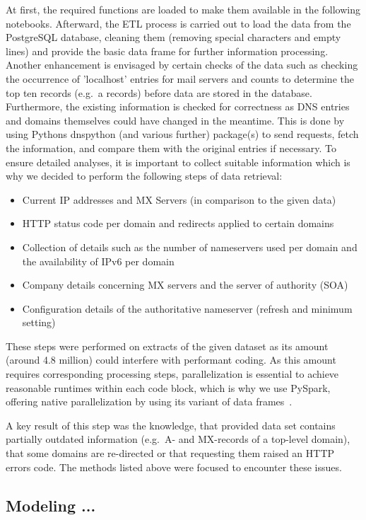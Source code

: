 At first, the required functions are loaded to make them available in the following notebooks.
Afterward, the ETL process is carried out to load the data from the PostgreSQL database, cleaning them (removing special characters and empty lines) and provide the basic data frame for further information processing.
Another enhancement is envisaged by certain checks of the data such as checking the occurrence of 'localhost' entries for mail servers and counts to determine the top ten records (e.g.\ a records) before data are stored in the database.
Furthermore, the existing information is checked for correctness as DNS entries and domains themselves could have changed in the meantime.
This is done by using Pythons dnspython (and various further) package(s) to send requests, fetch the information, and compare them with the original entries if necessary.
To ensure detailed analyses, it is important to collect suitable information which is why we decided to perform the following steps of data retrieval:
\begin{itemize}
    \item Current IP addresses and MX Servers (in comparison to the given data)
    \item HTTP status code per domain and redirects applied to certain domains
    \item Collection of details such as the number of nameservers used per domain and the availability of IPv6 per domain
    \item Company details concerning MX servers and the server of authority (SOA)
    \item Configuration details of the authoritative nameserver (refresh and minimum setting)
\end{itemize}
These steps were performed on extracts of the given dataset as its amount (around 4.8 million) could interfere with performant coding.
As this amount requires corresponding processing steps, parallelization is essential to achieve reasonable runtimes within each code block, which is why we use PySpark, offering native parallelization by using its variant of data frames~\autocite[cf.][]{Weber.2019}.

A key result of this step was the knowledge, that provided data set contains partially outdated information (e.g.\ A- and MX-records of a top-level domain), that some domains are re-directed or that requesting them raised an HTTP errors code.
The methods listed above were focused to encounter these issues.

\subsection{Modeling ...}\label{subsec:modeling}

